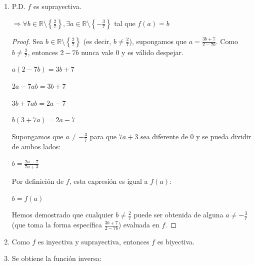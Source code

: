 \documentclass{article}
\begin{document}
\begin{enumerate}
\begin{enumerate}
\begin{enumerate}
\begin{proof}
                \end{proof}
            \item[2.] P.D. \( f \) es suprayectiva.
                
                \(\Rightarrow \forall b \in \mathbb{R} \setminus \left\{\frac{2}{7}\right\}, \exists a \in \mathbb{R} \setminus \left\{-\frac{3}{7}\right\} \) tal que \( f(a) = b \)
                
                \begin{proof} Sea \( b \in \mathbb{R} \setminus \left\{\frac{2}{7}\right\} \) (es decir, \( b \neq \frac{2}{7} \)), supongamos que \( a = \frac{3b + 7}{2 - 7b} \). Como \( b \neq \frac{2}{7} \), entonces \( 2 - 7b \) nunca vale \( 0 \) y es válido despejar.
                
                \( a(2 - 7b) = 3b + 7 \)
                
                \( 2a - 7ab = 3b + 7 \)
                
                \( 3b + 7ab = 2a - 7 \)
                
                \( b(3 + 7a) = 2a - 7 \)
                \vspace{\baselineskip}
                
                Supongamos que \( a \neq -\frac{3}{7} \) para que \( 7a + 3 \) sea diferente de \( 0 \) y se pueda dividir de ambos lados:
                
                \( b = \frac{2a - 7}{7a + 3} \)
                \vspace{\baselineskip}
                
                Por definición de \( f \), esta expresión es igual a \( f(a) \):
                
                \( b = f(a) \)
                \vspace{\baselineskip}
                
                Hemos demostrado que cualquier \( b \neq \frac{2}{7} \) puede ser obtenida de alguna \( a \neq -\frac{3}{7} \) (que toma la forma específica \( \frac{3b + 7}{2 - 7b} \)) evaluada en \( f \).
                
                \end{proof}
            \item[3.] Como \( f \) es inyectiva y suprayectiva, entonces \( f \) es biyectiva.
            
            \item[4.] Se obtiene la función inversa:
            

\end{enumerate}
\end{enumerate}
\end{enumerate}
\end{document}
